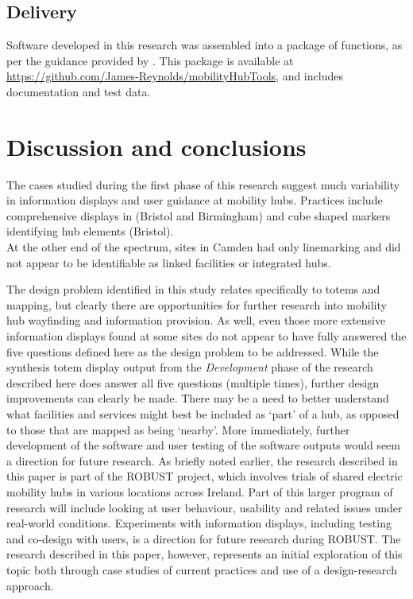 \documentclass[preprint, 3p,
authoryear]{elsarticle} %
\begin{document}
\subsection{Delivery}\label{delivery}

Software developed in this research was assembled into a package of
functions, as per the guidance provided by \citet{wickham2023r}. This
package is available at
\url{https://github.com/James-Reynolds/mobilityHubTools}, and includes
documentation and test data.

\section{Discussion and conclusions}\label{discussion-and-conclusions}

The cases studied during the first phase of this research suggest much
variability in information displays and user guidance at mobility hubs.
Practices include comprehensive displays in (Bristol and Birmingham) and
cube shaped markers identifying hub elements (Bristol).\\
At the other end of the spectrum, sites in Camden had only linemarking
and did not appear to be identifiable as linked facilities or integrated
hubs.

The design problem identified in this study relates specifically to
totems and mapping, but clearly there are opportunities for further
research into mobility hub wayfinding and information provision. As
well, even those more extensive information displays found at some sites
do not appear to have fully answered the five questions defined here as
the design problem to be addressed. While the synthesis totem display
output from the \emph{Development} phase of the research described here
does answer all five questions (multiple times), further design
improvements can clearly be made. There may be a need to better
understand what facilities and services might best be included as `part'
of a hub, as opposed to those that are mapped as being `nearby'. More
immediately, further development of the software and user testing of the
software outputs would seem a direction for future research. As briefly
noted earlier, the research described in this paper is part of the
ROBUST project, which involves trials of shared electric mobility hubs
in various locations across Ireland. Part of this larger program of
research will include looking at user behaviour, usability and related
issues under real-world conditions. Experiments with information
displays, including testing and co-design with users, is a direction for
future research during ROBUST. The research described in this paper,
however, represents an initial exploration of this topic both through
case studies of current practices and use of a design-research approach.
\end{document}
